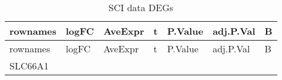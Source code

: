 \documentclass[
]{article}
\begin{document}
\begin{longtable}[]{@{}lllllll@{}}
\caption{\label{tab:SCI-data-DEGs}SCI data DEGs}\tabularnewline
\toprule
\begin{minipage}[b]{0.08\columnwidth}\raggedright
rownames\strut
\end{minipage} & \begin{minipage}[b]{0.12\columnwidth}\raggedright
logFC\strut
\end{minipage} & \begin{minipage}[b]{0.12\columnwidth}\raggedright
AveExpr\strut
\end{minipage} & \begin{minipage}[b]{0.12\columnwidth}\raggedright
t\strut
\end{minipage} & \begin{minipage}[b]{0.12\columnwidth}\raggedright
P.Value\strut
\end{minipage} & \begin{minipage}[b]{0.12\columnwidth}\raggedright
adj.P.Val\strut
\end{minipage} & \begin{minipage}[b]{0.12\columnwidth}\raggedright
B\strut
\end{minipage}\tabularnewline
\midrule
\endfirsthead
\toprule
\begin{minipage}[b]{0.08\columnwidth}\raggedright
rownames\strut
\end{minipage} & \begin{minipage}[b]{0.12\columnwidth}\raggedright
logFC\strut
\end{minipage} & \begin{minipage}[b]{0.12\columnwidth}\raggedright
AveExpr\strut
\end{minipage} & \begin{minipage}[b]{0.12\columnwidth}\raggedright
t\strut
\end{minipage} & \begin{minipage}[b]{0.12\columnwidth}\raggedright
P.Value\strut
\end{minipage} & \begin{minipage}[b]{0.12\columnwidth}\raggedright
adj.P.Val\strut
\end{minipage} & \begin{minipage}[b]{0.12\columnwidth}\raggedright
B\strut
\end{minipage}\tabularnewline
\midrule
\endhead
\begin{minipage}[t]{0.08\columnwidth}\raggedright
SLC66A1\strut
\end{minipage} & \begin{minipage}[t]{0.12\columnwidth}\raggedright

\end{minipage}
\end{longtable}
\end{document}
